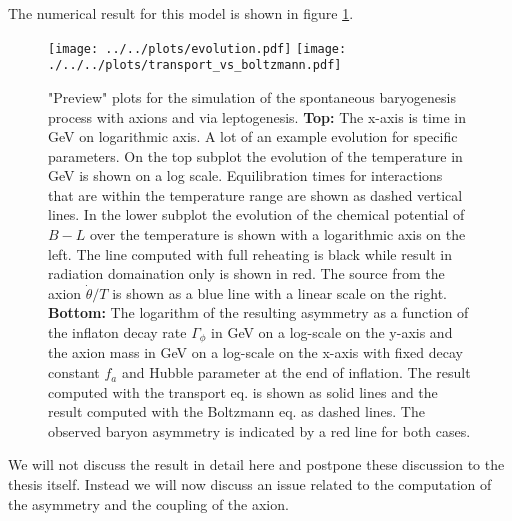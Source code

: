 \documentclass[13pt,a4paper,titlepage]{article}
\begin{document}
The numerical result for this model is shown in figure \ref{fig:naive_model_plot}.
\begin{figure}
    \centering
    \texttt{[image: ../../plots/evolution.pdf]} %
    \texttt{[image: ./../../plots/transport\_vs\_boltzmann.pdf]} %
    \caption{"Preview" plots for the simulation of the spontaneous baryogenesis process with axions and via leptogenesis.
    \textbf{Top:} The x-axis is time in GeV on logarithmic axis. A lot of an example evolution for specific parameters. On the top subplot the evolution of the temperature in GeV is shown on a log scale. Equilibration times for interactions that are within the temperature range are shown as dashed vertical lines. In the lower subplot the evolution of the chemical potential of $B - L$ over the temperature is shown with a logarithmic axis on the left. The line computed with full reheating is black while result in radiation domaination only is shown in red. The source from the axion $\dot{\theta} / T$ is shown as a blue line with a linear scale on the right.  \textbf{Bottom:} The logarithm of the resulting asymmetry as a function of the inflaton decay rate $\Gamma_\phi$ in GeV on a log-scale on the y-axis and the axion mass in GeV on a log-scale on the x-axis with fixed decay constant $f_a$ and Hubble parameter at the end of inflation. The result computed with the transport eq. is shown as solid lines and the result computed with the Boltzmann eq. as dashed lines. The observed baryon asymmetry is indicated by a red line for both cases. }
    \label{fig:naive_model_plot}
\end{figure}
We will not discuss the result in detail here and postpone these discussion to the thesis itself.
Instead we will now discuss an issue related to the computation of the asymmetry and the coupling of the axion.
\end{document}
